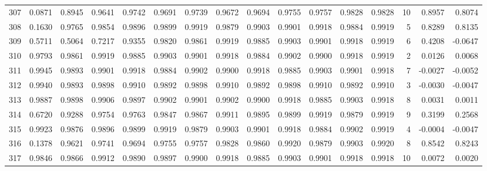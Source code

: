\begin{tabular}{lrrrrrrrrrrrrrrr}
307 &      0.0871 &  0.8945 &  0.9641 &  0.9742 &  0.9691 &  0.9739 &  0.9672 &  0.9694 &  0.9755 &  0.9757 &   0.9828 &     0.9828 &     10 &                    0.8957 &                     0.8074 \\
308 &      0.1630 &  0.9765 &  0.9854 &  0.9896 &  0.9899 &  0.9919 &  0.9879 &  0.9903 &  0.9901 &  0.9918 &   0.9884 &     0.9919 &      5 &                    0.8289 &                     0.8135 \\
309 &      0.5711 &  0.5064 &  0.7217 &  0.9355 &  0.9820 &  0.9861 &  0.9919 &  0.9885 &  0.9903 &  0.9901 &   0.9918 &     0.9919 &      6 &                    0.4208 &                    -0.0647 \\
310 &      0.9793 &  0.9861 &  0.9919 &  0.9885 &  0.9903 &  0.9901 &  0.9918 &  0.9884 &  0.9902 &  0.9900 &   0.9918 &     0.9919 &      2 &                    0.0126 &                     0.0068 \\
311 &      0.9945 &  0.9893 &  0.9901 &  0.9918 &  0.9884 &  0.9902 &  0.9900 &  0.9918 &  0.9885 &  0.9903 &   0.9901 &     0.9918 &      7 &                   -0.0027 &                    -0.0052 \\
312 &      0.9940 &  0.9893 &  0.9898 &  0.9910 &  0.9892 &  0.9898 &  0.9910 &  0.9892 &  0.9898 &  0.9910 &   0.9892 &     0.9910 &      3 &                   -0.0030 &                    -0.0047 \\
313 &      0.9887 &  0.9898 &  0.9906 &  0.9897 &  0.9902 &  0.9901 &  0.9902 &  0.9900 &  0.9918 &  0.9885 &   0.9903 &     0.9918 &      8 &                    0.0031 &                     0.0011 \\
314 &      0.6720 &  0.9288 &  0.9754 &  0.9763 &  0.9847 &  0.9867 &  0.9911 &  0.9895 &  0.9899 &  0.9919 &   0.9879 &     0.9919 &      9 &                    0.3199 &                     0.2568 \\
315 &      0.9923 &  0.9876 &  0.9896 &  0.9899 &  0.9919 &  0.9879 &  0.9903 &  0.9901 &  0.9918 &  0.9884 &   0.9902 &     0.9919 &      4 &                   -0.0004 &                    -0.0047 \\
316 &      0.1378 &  0.9621 &  0.9741 &  0.9694 &  0.9755 &  0.9757 &  0.9828 &  0.9860 &  0.9920 &  0.9879 &   0.9903 &     0.9920 &      8 &                    0.8542 &                     0.8243 \\
317 &      0.9846 &  0.9866 &  0.9912 &  0.9890 &  0.9897 &  0.9900 &  0.9918 &  0.9885 &  0.9903 &  0.9901 &   0.9918 &     0.9918 &     10 &                    0.0072 &                     0.0020 \\

\end{tabular}
